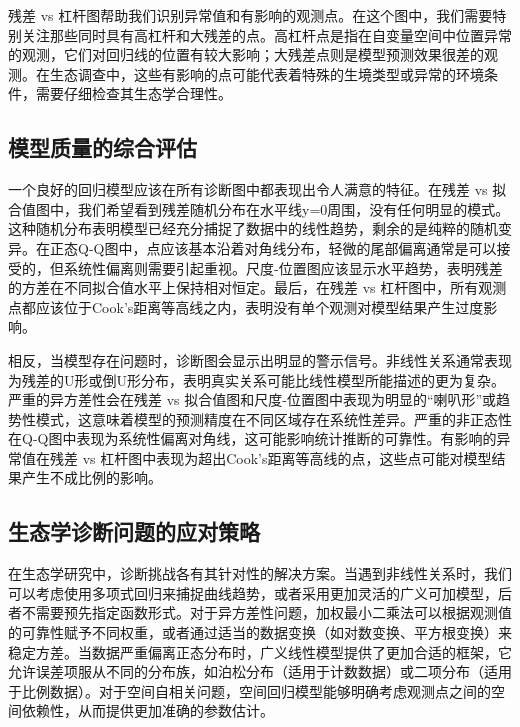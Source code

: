 \documentclass[
  twoside,12pt,fontset=none]{ctexbook}
\begin{document}
残差 vs 杠杆图帮助我们识别异常值和有影响的观测点。在这个图中，我们需要特别关注那些同时具有高杠杆和大残差的点。高杠杆点是指在自变量空间中位置异常的观测，它们对回归线的位置有较大影响；大残差点则是模型预测效果很差的观测。在生态调查中，这些有影响的点可能代表着特殊的生境类型或异常的环境条件，需要仔细检查其生态学合理性。

\hypertarget{ux6a21ux578bux8d28ux91cfux7684ux7efcux5408ux8bc4ux4f30}{%
\subsection{模型质量的综合评估}\label{ux6a21ux578bux8d28ux91cfux7684ux7efcux5408ux8bc4ux4f30}}

一个良好的回归模型应该在所有诊断图中都表现出令人满意的特征。在残差 vs 拟合值图中，我们希望看到残差随机分布在水平线y=0周围，没有任何明显的模式。这种随机分布表明模型已经充分捕捉了数据中的线性趋势，剩余的是纯粹的随机变异。在正态Q-Q图中，点应该基本沿着对角线分布，轻微的尾部偏离通常是可以接受的，但系统性偏离则需要引起重视。尺度-位置图应该显示水平趋势，表明残差的方差在不同拟合值水平上保持相对恒定。最后，在残差 vs 杠杆图中，所有观测点都应该位于Cook's距离等高线之内，表明没有单个观测对模型结果产生过度影响。

相反，当模型存在问题时，诊断图会显示出明显的警示信号。非线性关系通常表现为残差的U形或倒U形分布，表明真实关系可能比线性模型所能描述的更为复杂。严重的异方差性会在残差 vs 拟合值图和尺度-位置图中表现为明显的``喇叭形''或趋势性模式，这意味着模型的预测精度在不同区域存在系统性差异。严重的非正态性在Q-Q图中表现为系统性偏离对角线，这可能影响统计推断的可靠性。有影响的异常值在残差 vs 杠杆图中表现为超出Cook's距离等高线的点，这些点可能对模型结果产生不成比例的影响。

\hypertarget{ux751fux6001ux5b66ux8bcaux65adux95eeux9898ux7684ux5e94ux5bf9ux7b56ux7565}{%
\subsection{生态学诊断问题的应对策略}\label{ux751fux6001ux5b66ux8bcaux65adux95eeux9898ux7684ux5e94ux5bf9ux7b56ux7565}}

在生态学研究中，诊断挑战各有其针对性的解决方案。当遇到非线性关系时，我们可以考虑使用多项式回归来捕捉曲线趋势，或者采用更加灵活的广义可加模型，后者不需要预先指定函数形式。对于异方差性问题，加权最小二乘法可以根据观测值的可靠性赋予不同权重，或者通过适当的数据变换（如对数变换、平方根变换）来稳定方差。当数据严重偏离正态分布时，广义线性模型提供了更加合适的框架，它允许误差项服从不同的分布族，如泊松分布（适用于计数数据）或二项分布（适用于比例数据）。对于空间自相关问题，空间回归模型能够明确考虑观测点之间的空间依赖性，从而提供更加准确的参数估计。
\end{document}
